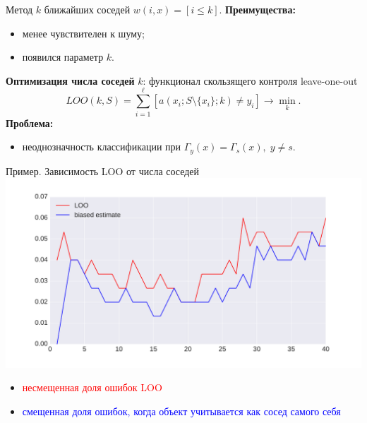 \documentclass{beamer}
\begin{document}
\begin{frame}{Метод $k$ ближайших соседей}
$w(i, x) = [i \le k]$.
\vfill
{\bf Преимущества:}
\begin{itemize}
    \item менее чувствителен к шуму;
    \item появился параметр $k$.
\end{itemize}
{\bf Оптимизация числа соседей} $k$:
функционал скользящего контроля leave-one-out
$$
LOO(k, S) = \sum\limits_{i=1}^{\ell}\left[a(x_i; S\setminus\{x_i\}; k) \ne y_i\right] \rightarrow \min_k.
$$
{\bf Проблема:}
\begin{itemize}
    \item неоднозначность классификации при $\Gamma_y(x) = \Gamma_s(x),\; y \ne s$.
\end{itemize}
\end{frame}

\begin{frame}{Пример. Зависимость LOO от числа соседей}
\includegraphics[width=\linewidth]{../fig/iris_knn_loo.pdf}
\begin{itemize}
    \item \textcolor{red}{несмещенная доля ошибок LOO}
    \item \textcolor{blue}{смещенная доля ошибок, когда объект учитывается как сосед самого себя}
\end{itemize}
\end{frame}
\end{document}
